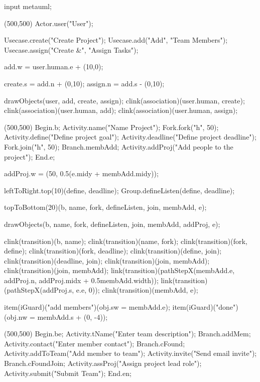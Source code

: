 \begin{empfile}
\begin{empcmds}
input metauml;
\end{empcmds}

\begin{empdef}[usecasediag](500,500)
  Actor.user("User");

  Usecase.create("Create Project");
  Usecase.add("Add", "Team Members");
  Usecase.assign("Create &", "Assign Tasks");

  add.w = user.human.e + (10,0);

  create.s = add.n + (0,10);
  assign.n = add.s - (0,10);
  
  
  drawObjects(user, add, create, assign);
  clink(association)(user.human, create);
  clink(association)(user.human, add);
  clink(association)(user.human, assign);
\end{empdef}

\begin{empdef}[activityR1](500,500)
Begin.b;
Activity.name("Name Project");
Fork.fork("h", 50);
Activity.define("Define project goal");
Activity.deadline("Define project deadline");
Fork.join("h", 50);
Branch.membAdd;
Activity.addProj("Add people to the project");
End.e;

addProj.w = (50, 0.5(e.midy + membAdd.midy));


leftToRight.top(10)(define, deadline);
Group.defineListen(define, deadline);

topToBottom(20)(b, name, fork, defineListen, join, membAdd, e);



drawObjects(b, name, fork, defineListen, join, membAdd, addProj, e);

clink(transition)(b, name);
clink(transition)(name, fork);
clink(transition)(fork, define);
clink(transition)(fork, deadline);
clink(transition)(define, join);
clink(transition)(deadline, join);
clink(transition)(join, membAdd);
clink(transition)(join, membAdd);
link(transition)(pathStepX(membAdd.e, addProj.n,  addProj.midx + 0.5membAdd.width));
link(transition)(pathStepX(addProj.s, e.e, 0));
clink(transition)(membAdd, e);

item(iGuard)("add members")(obj.sw = membAdd.e);
item(iGuard)("done")(obj.nw = membAdd.s + (0, -4));
\end{empdef}

\begin{empdef}[activityR2](500,500)
Begin.be;
Activity.tName("Enter team description");
Branch.addMem;
Activity.contact("Enter member contact");
Branch.cFound;
Activity.addToTeam("Add member to team");
Activity.invite("Send email invite");
Branch.cFoundJoin;
Activity.assProj("Assign project lead role");
Activity.submit("Submit Team");
End.en;


\end{empdef}
\end{empfile}
